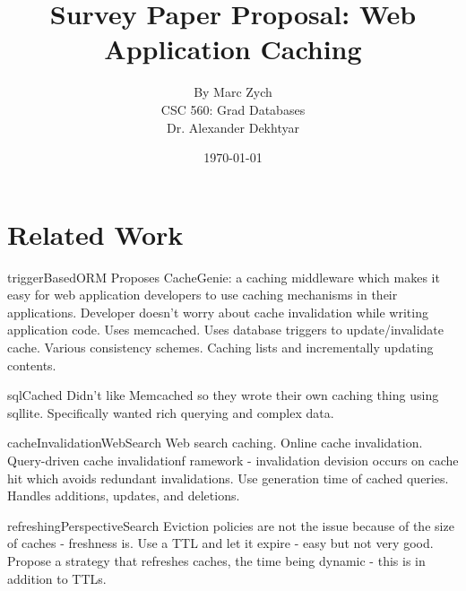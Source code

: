 \documentclass[12pt]{article}
\begin{document}
\title{\vfill Survey Paper Proposal: Web Application Caching}

\author{
By Marc Zych \vspace{10pt} \\
CSC 560: Grad Databases \vspace{10pt} \\
Dr. Alexander Dekhtyar \vspace{10pt} \\
}
\date{\today}

\maketitle


\thispagestyle{empty}
\newpage



\section{Related Work}
triggerBasedORM \cite{triggerBasedORM}
Proposes CacheGenie: a caching middleware which makes it easy for web application developers to use caching mechanisms in their applications.
Developer doesn't worry about cache invalidation while writing application code.
Uses memcached.
Uses database triggers to update/invalidate cache.
Various consistency schemes.
Caching lists and incrementally updating contents.

sqlCached \cite{sqlCached}
Didn't like Memcached so they wrote their own caching thing using sqllite.
Specifically wanted rich querying and complex data.

cacheInvalidationWebSearch \cite{cacheInvalidationWebSearch}
Web search caching.
Online cache invalidation.
Query-driven cache invalidationf ramework - invalidation devision occurs on cache hit which avoids redundant invalidations.
Use generation time of cached queries.
Handles additions, updates, and deletions.

refreshingPerspectiveSearch \cite{refreshingPerspectiveSearch}
Eviction policies are not the issue because of the size of caches - freshness is.
Use a TTL and let it expire - easy but not very good.
Propose a strategy that refreshes caches, the time being dynamic - this is in addition to TTLs.
\end{document}
